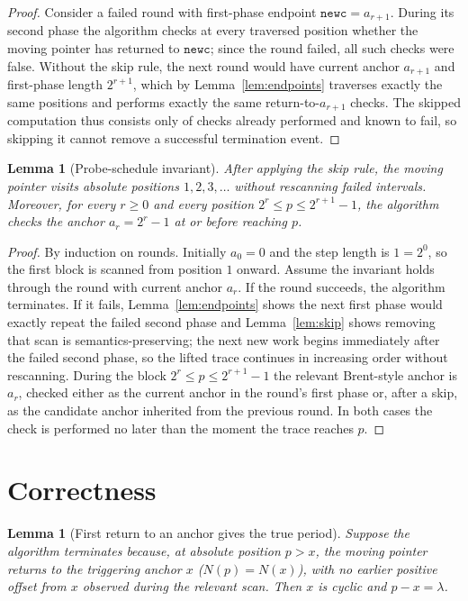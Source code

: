 \documentclass[11pt]{article}
\newtheorem{lemma}[theorem]{Lemma}
\newcommand{\newc}{\texttt{newc}}
\begin{document}
\begin{proof}
Consider a failed round with first-phase endpoint $\newc=a_{r+1}$. During its
second phase the algorithm checks at every traversed position whether the moving
pointer has returned to $\newc$; since the round failed, all such checks were
false. Without the skip rule, the next round would have current anchor $a_{r+1}$
and first-phase length $2^{r+1}$, which by Lemma~\ref{lem:endpoints} traverses
exactly the same positions and performs exactly the same return-to-$a_{r+1}$
checks. The skipped computation thus consists only of checks already performed
and known to fail, so skipping it cannot remove a successful termination event.
\end{proof}

\begin{lemma}[Probe-schedule invariant]
\label{lem:schedule}
After applying the skip rule, the moving pointer visits absolute positions
$1,2,3,\dots$ without rescanning failed intervals. Moreover, for every $r\ge 0$
and every position $2^r\le p\le 2^{r+1}-1$, the algorithm checks the anchor
$a_r=2^r-1$ at or before reaching $p$.
\end{lemma}

\begin{proof}
By induction on rounds. Initially $a_0=0$ and the step length is $1=2^0$, so the
first block is scanned from position $1$ onward. Assume the invariant holds
through the round with current anchor $a_r$. If the round succeeds, the algorithm
terminates. If it fails, Lemma~\ref{lem:endpoints} shows the next first phase
would exactly repeat the failed second phase and Lemma~\ref{lem:skip} shows
removing that scan is semantics-preserving; the next new work begins immediately
after the failed second phase, so the lifted trace continues in increasing order
without rescanning. During the block $2^r\le p\le 2^{r+1}-1$ the relevant
Brent-style anchor is $a_r$, checked either as the current anchor in the round's
first phase or, after a skip, as the candidate anchor inherited from the previous
round. In both cases the check is performed no later than the moment the trace
reaches $p$.
\end{proof}

\section{Correctness}
\label{sec:correctness}

\begin{lemma}[First return to an anchor gives the true period]
\label{lem:first-return}
Suppose the algorithm terminates because, at absolute position $p>x$, the moving
pointer returns to the triggering anchor $x$ ($N(p)=N(x)$), with no earlier
positive offset from $x$ observed during the relevant scan. Then $x$ is cyclic
and $p-x=\lambda$.
\end{lemma}
\end{document}
